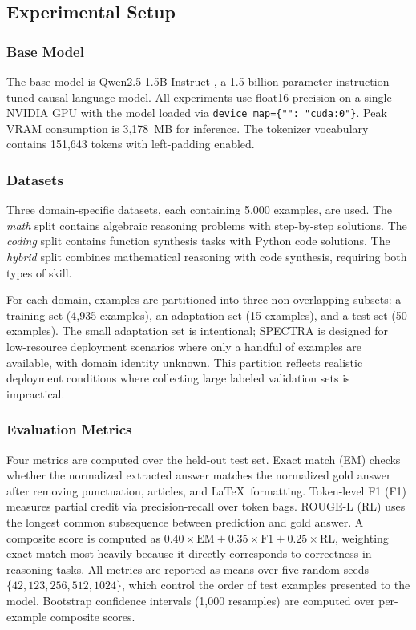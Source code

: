 \documentclass[preprint,12pt]{elsarticle}
\begin{document}
\subsection{Experimental Setup}
\label{subsec:setup}

\subsubsection{Base Model}

The base model is Qwen2.5-1.5B-Instruct \cite{qwen2025}, a 1.5-billion-parameter
instruction-tuned causal language model. All experiments use float16 precision
on a single NVIDIA GPU with the model loaded via \texttt{device\_map=\{"": "cuda:0"\}}.
Peak VRAM consumption is 3,178~MB for inference. The tokenizer vocabulary
contains 151,643 tokens with left-padding enabled.

\subsubsection{Datasets}

Three domain-specific datasets, each containing 5,000 examples, are used.
The \textit{math} split contains algebraic reasoning problems with step-by-step
solutions. The \textit{coding}
split contains function synthesis tasks with Python code solutions. The
\textit{hybrid} split combines mathematical reasoning with code synthesis,
requiring both types of skill.

For each domain, examples are partitioned into three non-overlapping subsets:
a training set (4,935 examples), an adaptation set (15 examples), and a test
set (50 examples). The small adaptation set is intentional; SPECTRA is designed
for low-resource deployment scenarios where only a handful of examples are
available, with domain identity unknown. This partition reflects realistic
deployment conditions where collecting large labeled validation sets is
impractical.

\subsubsection{Evaluation Metrics}

Four metrics are computed over the held-out test set. Exact match (EM) checks
whether the normalized extracted answer matches the normalized gold answer after
removing punctuation, articles, and \LaTeX\ formatting. Token-level F1 (F1)
measures partial credit via precision-recall over token bags. ROUGE-L (RL)
uses the longest common subsequence between prediction and gold answer.
A composite score is computed as $0.40 \times \text{EM} + 0.35 \times \text{F1}
+ 0.25 \times \text{RL}$, weighting exact match most heavily because it directly
corresponds to correctness in reasoning tasks. All metrics are reported as means
over five random seeds $\{42, 123, 256, 512, 1024\}$, which control the order
of test examples presented to the model. Bootstrap confidence intervals (1,000
resamples) are computed over per-example composite scores.
\end{document}
